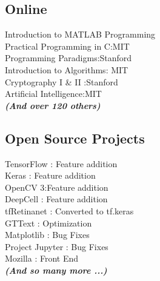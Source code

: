 \documentclass[]{deedy-resume-openfont}
\begin{document}
\begin{minipage}[t]{0.33\textwidth}

\subsection{Online}
Introduction to MATLAB Programming\\
Practical Programming in C:MIT\\
Programming Paradigms:Stanford \\
Introduction to Algorithms: MIT \\
Cryptography I \& II :Stanford\\
Artificial Intelligence:MIT\\
{\footnotesize \textit{\textbf{(And over 120 others) }}} \\
\sectionsep

\subsection{Open Source Projects}
TensorFlow : Feature addition\\
Keras : Feature addition \\
OpenCV 3:Feature addition\\
DeepCell : Feature addition \\
tfRetinanet : Converted to tf.keras \\
GTText : Optimization \\
Matplotlib : Bug Fixes\\
Project Jupyter : Bug Fixes \\
Mozilla : Front End\\

{\footnotesize \textit{\textbf{(And so many more ...) }}} \\
\sectionsep


%
%

\end{minipage} 
\hfill
\end{document}
